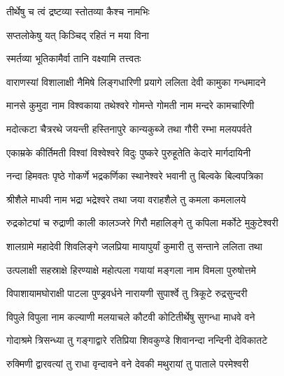
{तीर्थेषु च त्वं द्रष्टव्या स्तोतव्या कैश्च नामभिः}

{सप्तलोकेषु यत् किञ्चिद् रहितं न मया विना}

{स्मर्तव्या भूतिकामैर्वा तानि वक्ष्यामि तत्त्वतः}

\twolineshloka
{वाराणस्यां विशालाक्षी नैमिषे लिङ्गधारिणी}
{प्रयागे ललिता देवी कामुका गन्धमादने}

\twolineshloka
{मानसे कुमुदा नाम विश्वकाया तथेश्वरे}
{गोमन्ते गोमती नाम मन्दरे कामचारिणी}

\twolineshloka
{मदोत्कटा चैत्ररथे जयन्ती हस्तिनापुरे}
{कान्यकुब्जे तथा गौरी रम्भा मलयपर्वते}

\twolineshloka
{एकाम्रके कीर्तिमती विश्वां विश्वेश्वरे विदुः}
{पुष्करे पुरुहूतेति केदारे मार्गदायिनी}

\twolineshloka
{नन्दा हिमवतः पृष्ठे गोकर्णे भद्रकर्णिका}
{स्थानेश्वरे भवानी तु बिल्वके बिल्वपत्रिका}

\twolineshloka
{श्रीशैले माधवी नाम भद्रा भद्रेश्वरे तथा}
{जया वराहशैले तु कमला कमलालये}

\twolineshloka
{रुद्रकोट्यां च रुद्राणी काली कालञ्जरे गिरौ}
{महालिङ्गे तु कपिला मर्कोटे मुकुटेश्वरी}

\twolineshloka
{शालग्रामे महादेवी शिवलिङ्गे जलप्रिया}
{मायापुर्यां कुमारी तु सन्ताने ललिता तथा}

\twolineshloka
{उत्पलाक्षी सहस्राक्षे हिरण्याक्षे महोत्पला}
{गयायां मङ्गला नाम विमला पुरुषोत्तमे}

\twolineshloka
{विपाशायामघोराक्षी पाटला पुण्ड्रवर्धने}
{नारायणी सुपार्श्वे तु त्रिकूटे रुद्रसुन्दरी}

\twolineshloka
{विपुले विपुला नाम कल्याणी मलयाचले}
{कौटवी कोटितीर्थेषु सुगन्धा माधवे वने}

\twolineshloka
{गोदाश्रमे त्रिसन्ध्या तु गङ्गाद्वारे रतिप्रिया}
{शिवकुण्डे शिवानन्दा नन्दिनी देविकातटे}

\twolineshloka
{रुक्मिणी द्वारवत्यां तु राधा वृन्दावने वने}
{देवकी मथुरायां तु पाताले परमेश्वरी}

